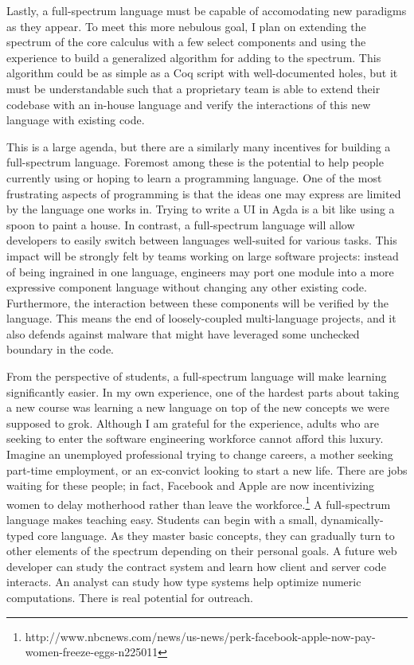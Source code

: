 \documentclass{article}
\begin{document}
Lastly, a full-spectrum language must be capable of accomodating new paradigms as they appear.
To meet this more nebulous goal, I plan on extending the spectrum of the core calculus with a few select components and using the experience to build a generalized algorithm for adding to the spectrum.
This algorithm could be as simple as a Coq script with well-documented holes, but it must be understandable such that a proprietary team is able to extend their codebase with an in-house language and verify the interactions of this new language with existing code.

This is a large agenda, but there are a similarly many incentives for building a full-spectrum language.
Foremost among these is the potential to help people currently using or hoping to learn a programming language.
One of the most frustrating aspects of programming is that the ideas one may express are limited by the language one works in.
Trying to write a UI in Agda is a bit like %
using a spoon to paint a house.
In contrast, a full-spectrum language will allow developers to easily switch between languages well-suited for various tasks.
This impact will be strongly felt by teams working on large software projects: instead of being ingrained in one language, engineers may port one module into a more expressive component language without changing any other existing code.
Furthermore, the interaction between these components will be verified by the language.
This means the end of loosely-coupled multi-language projects, and it also defends against malware that might have leveraged some unchecked boundary in the code.

From the perspective of students, a full-spectrum language will make learning significantly easier.
In my own experience, one of the hardest parts about taking a new course was learning a new language on top of the new concepts we were supposed to grok.
Although I am grateful for the experience, adults who are seeking to enter the software engineering workforce cannot afford this luxury.
Imagine an unemployed professional trying to change careers, a mother seeking part-time employment, or an ex-convict looking to start a new life.
There are jobs waiting for these people; in fact, Facebook and Apple are now incentivizing women to delay motherhood rather than leave the workforce.\footnote{http://www.nbcnews.com/news/us-news/perk-facebook-apple-now-pay-women-freeze-eggs-n225011}
A full-spectrum language makes teaching easy.
Students can begin with a small, dynamically-typed core language.
As they master basic concepts, they can gradually turn to other elements of the spectrum depending on their personal goals.
A future web developer can study the contract system and learn how client and server code interacts.
An analyst can study how type systems help optimize numeric computations.
There is real potential for outreach.
\end{document}
